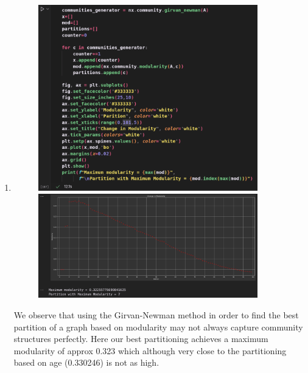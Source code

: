 \documentclass{article}
\begin{document}
\begin{enumerate}[label=(\alph*), left=10pt, itemsep=10pt]
        \newpage

        \item \begin{minipage}[t]{0.9\textwidth}
            \begin{figure}[H]
                \centering
                \includegraphics[width=0.9\textwidth, height=0.45\textheight]{./2f.png}
                \includegraphics[width=0.9\textwidth, height=0.3\textheight]{./2fi.png}
            \end{figure}
            We observe that using the Girvan-Newman method in order to find the best
            partition of a graph based on modularity may not always capture community structures
            perfectly. Here our best partitioning achieves a maximum modularity of approx
            0.323 which although very close to the partitioning based on age (0.330246)
            is not as high.
        \end{minipage}


\end{enumerate}
\end{document}
